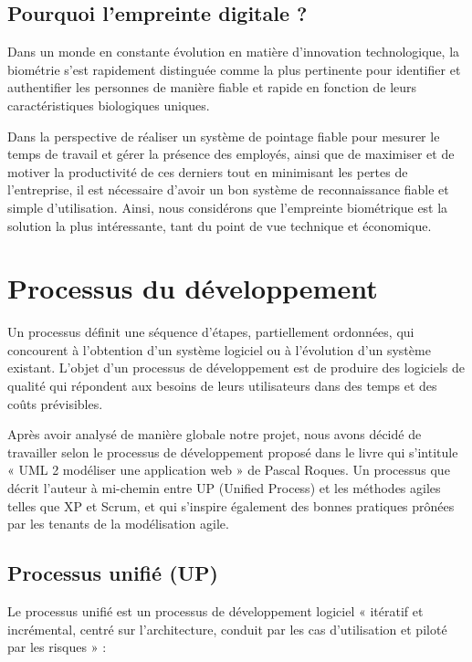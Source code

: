 \subsection{Pourquoi l’empreinte digitale ?}
Dans un monde en constante évolution en matière d’innovation technologique, la
biométrie s’est rapidement distinguée comme la plus pertinente pour identifier
et authentifier les personnes de manière fiable et rapide en fonction de leurs
caractéristiques biologiques uniques.

Dans la perspective de réaliser un système de pointage fiable pour mesurer le
temps de travail et gérer la présence des employés, ainsi que de maximiser et de
motiver la productivité de ces derniers tout en minimisant les pertes de
l’entreprise, il est nécessaire d’avoir un bon système de reconnaissance fiable
et simple d’utilisation. Ainsi, nous considérons que l’empreinte biométrique est
la solution la plus intéressante, tant du point de vue technique et économique. 

\section{Processus du développement}
Un processus définit une séquence d’étapes, partiellement ordonnées, qui
concourent à l’obtention d’un système logiciel ou à l’évolution d’un système
existant. L’objet d’un processus de développement est de produire des logiciels
de qualité qui répondent aux besoins de leurs utilisateurs dans des temps et des
coûts prévisibles. \cite{5}

Après avoir analysé de manière globale notre projet, nous avons décidé de
travailler selon le processus de développement proposé dans le livre qui
s’intitule « UML 2 modéliser une application web » de Pascal Roques. Un
processus que décrit l’auteur à mi-chemin entre UP (Unified Process) et les
méthodes agiles telles que XP et Scrum, et qui s’inspire également des bonnes
pratiques prônées par les tenants de la modélisation agile.

\subsection{Processus unifié (UP)}
Le processus unifié est un processus de développement logiciel « itératif et
incrémental, centré sur l’architecture, conduit par les cas d’utilisation et
piloté par les risques » :
    
